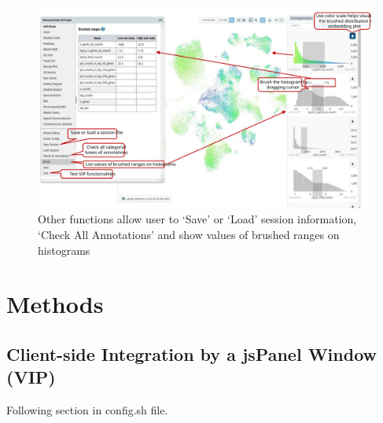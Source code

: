 \documentclass[
]{article}
\begin{document}
\begin{figure}
\centering
\includegraphics{figures/F24_label.svg}
\caption{Other functions allow user to `Save' or `Load' session information, `Check All Annotations' and show values of brushed ranges on histograms}
\end{figure}

\hypertarget{methods}{%
\section{Methods}\label{methods}}

\hypertarget{client-side-integration-by-a-jspanel-window-vip}{%
\subsection*{Client-side Integration by a jsPanel Window (VIP)}\label{client-side-integration-by-a-jspanel-window-vip}}

Following section in config.sh file.
\end{document}

